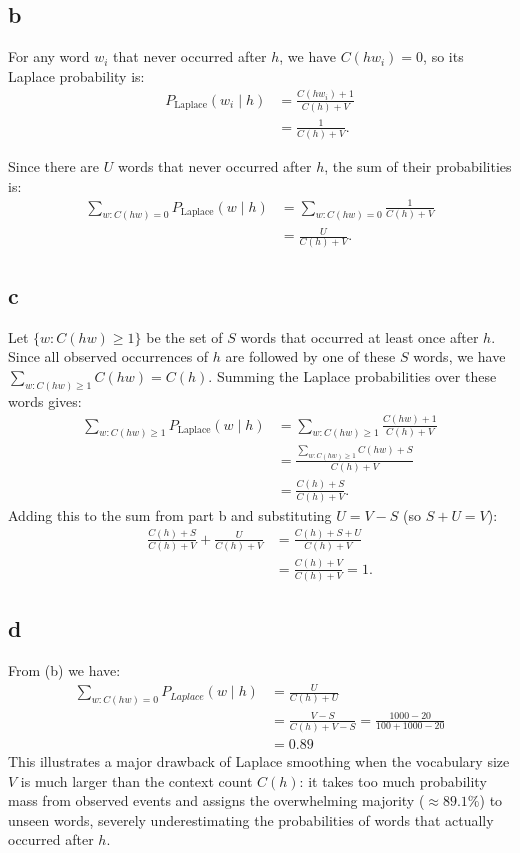 \documentclass{article}
\numberwithin{equation}{section}
\begin{document}
    \subsection*{b}

    For any word $w_i$ that never occurred after $h$, we have $C(hw_i) = 0$, so its Laplace probability is:
    \begin{align*}
        P_{\mathrm{Laplace}}(w_i \mid h)
            &= \frac{C(hw_i) + 1}{C(h) + V} \\
            &= \frac{1}{C(h) + V}.
    \end{align*}

    Since there are $U$ words that never occurred after $h$, the sum of their probabilities is:
    \begin{align*}
        \sum_{w : C(hw) = 0} P_{\mathrm{Laplace}}(w \mid h)
            &= \sum_{w : C(hw) = 0} \frac{1}{C(h) + V} \\
            &= \frac{U}{C(h) + V}.
    \end{align*}

    \subsection*{c}
    Let $\{w : C(hw) \ge 1\}$ be the set of $S$ words that occurred at least once after $h$. Since all observed occurrences of $h$ are followed by one of these $S$ words, we have $\sum_{w : C(hw) \ge 1} C(hw) = C(h)$. Summing the Laplace probabilities over these words gives:
    \begin{align*}
        \sum_{w : C(hw) \ge 1} P_{\mathrm{Laplace}}(w \mid h)
            &= \sum_{w : C(hw) \ge 1} \frac{C(hw) + 1}{C(h) + V} \\
            &= \frac{\sum_{w : C(hw) \ge 1} C(hw) + S}{C(h) + V} \\
            &= \frac{C(h) + S}{C(h) + V}.
    \end{align*}
%
    Adding this to the sum from part b and substituting $U = V - S$ (so $S + U = V$):
    \begin{align*}
        \frac{C(h) + S}{C(h) + V} + \frac{U}{C(h) + V}
            &= \frac{C(h) + S + U}{C(h) + V} \\
            &= \frac{C(h) + V}{C(h) + V} = 1.
    \end{align*}

    \subsection*{d}
    From (b) we have:
    \begin{align*}
        \sum_{w : C(hw) = 0}P_{Laplace}(w \mid h) &= \frac{U}{C(h) + U} \\
            &= \frac{V - S}{C(h) + V - S} = \frac{1000 - 20}{100 + 1000 - 20} \\
            &= 0.89
    \end{align*}
    This illustrates a major drawback of Laplace smoothing when the vocabulary size $V$ is much larger than the context count $C(h)$: it takes too much probability mass from observed events and assigns the overwhelming majority ($\approx 89.1\%$) to unseen words, severely underestimating the probabilities of words that actually occurred after $h$.
\end{document}
